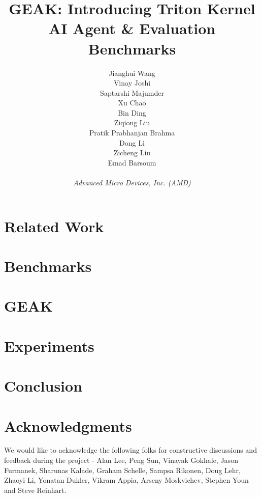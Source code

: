 \documentclass{article}
\title{GEAK: Introducing Triton Kernel AI Agent \& Evaluation Benchmarks
}
\author{
  Jianghui Wang\footnotemark[1]   \\
   \And
   Vinay Joshi\footnotemark[1]  \\
   \And
   Saptarshi Majumder\\
  \And
  Xu Chao\\
  \And
  Bin Ding \\
  \And
  Ziqiong Liu \\
  \And
  Pratik Prabhanjan Brahma \\
  \And
  Dong Li \\
  \And
  Zicheng Liu \\
  \And
  Emad Barsoum \\
  \\
  \AND
  \textit{Advanced Micro Devices, Inc. (AMD)}
}
\begin{document}
\maketitle









\section{Related Work}
\label{sec:headings}


\section{Benchmarks}
\label{sec:others}


\section{GEAK}


\section{Experiments}


\section{Conclusion}


\section*{Acknowledgments}
We would like to acknowledge the following folks for constructive discussions and feedback during the project - Alan Lee, Peng Sun, Vinayak Gokhale, Jason Furmanek, Sharunas Kalade, Graham Schelle, Sampsa Rikonen, Doug Lehr, Zhaoyi Li, Yonatan Dukler, Vikram Appia, Arseny Moskvichev, Stephen Youn and Steve Reinhart.
\end{document}
